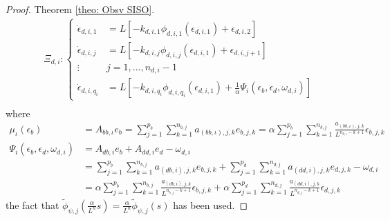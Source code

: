 \documentclass[11pt,letterpaper,twoside,openright]{report}
\begin{document}
\begin{proof}{Theorem \ref{theo: Obsv SISO}. \\}
\begin{equation}
	\begin{split}\label{ecu: CH4 Error1d}
		\Xi_{d,i}: \left\{
		\begin{array}{rl}
			\dot{\epsilon}_{d,i,1} &= L\left[ -k_{d,i,1} \phi_{d,i,1}( \epsilon_{d,i,1} ) + \epsilon_{d,i,2} \right] \\
			\dot{\epsilon}_{d,i,j} &= L\left[ -k_{d,i,j} \phi_{d,i,j}( \epsilon_{d,i,1} ) + \epsilon_{d,i,j+1} \right] \\
			\vdots \quad & j=1,...,n_{d,i}-1\\
			\dot{\epsilon}_{d,i,q_i} &= L\left[ -k_{d,i,q_i} \phi_{d,i,q_i}( \epsilon_{d,i,1} ) + \frac{1}{\alpha}\Psi_{i}(\epsilon_b,\epsilon_d,\omega_{d,i}) \right]
		\end{array}
		\right. \\
	\end{split}
\end{equation}
	where
\begin{equation}
	\begin{split}
		\mu_{\iota}(\epsilon_b) &= A_{bb,\iota}e_b = \sum_{j=1}^{p_b}\sum_{k=1}^{n_{b,j}} a_{(bb,\iota),j,k} e_{b,j,k}= \alpha\sum_{j=1}^{p_b}\sum_{k=1}^{n_{b,j}} \frac{a_{(bb,\iota),j,k}}{L^{n_{b,\iota}-k+1}}\epsilon_{b,j,k} \\
		\Psi_{i}(\epsilon_b,\epsilon_d,\omega_{d,i}) &= A_{db,i}e_b + A_{dd,i}e_d - \omega_{d,i} \\
		&=\sum_{j=1}^{p_b}\sum_{k=1}^{n_{b,j}} a_{(db,i),j,k}e_{b,j,k} + \sum_{j=1}^{p_d}\sum_{k=1}^{n_{d,j}} a_{(dd,i),j,k}e_{d,j,k} - \omega_{d,i} \\
		&=\alpha \sum_{j=1}^{p_b}\sum_{k=1}^{n_{b,j}}  \frac{a_{(db,i),j,k}}{L^{n_{b,j}-k+1}} \epsilon_{b,j,k}
		+ \alpha \sum_{j=1}^{p_d}\sum_{k=1}^{n_{d,j}}  \frac{a_{(dd,i),j,k}}{L^{n_{d,j}-k+1}} \epsilon_{d,j,k}
	\end{split} 
\end{equation}
	the fact that $\tilde{\phi}_{\psi,j}( \frac{\alpha}{L^n}s ) = \frac{\alpha}{L^n}\tilde{\phi}_{\psi,j}(s)$ has been used.
	

\end{proof}
\end{document}
